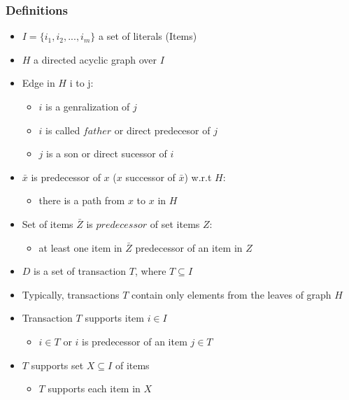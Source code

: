 \documentclass{article}
\begin{document}
\subsubsection{Definitions}
\begin{itemize}
  \item $I = \{i_1, i_2, ..., i_m\}$ a set of literals (Items)
  \item $H$ a directed acyclic graph over $I$
  \item Edge in $H$ i to j:

  \begin{itemize}
    \item $i$ is a genralization of $j$
    \item $i$ is called $father$ or direct predecesor of $j$
    \item $j$ is a son or direct sucessor of $i$
  \end{itemize}

  \item $\bar{x}$ is predecessor of $x$ ($x$ successor of $\bar{x}$) w.r.t $H$:
  \begin{itemize}
    \item there is a path from $x$ to $x$ in $H$
  \end{itemize}

  \item Set of items $\bar{Z}$ is $predecessor$ of set items $Z$:
  \begin{itemize}
    \item at least one item in $\bar{Z}$ predecessor of an item in $Z$
  \end{itemize}

  \item $D$ is a set of transaction $T$, where $T \subseteq I$
  \item Typically, transactions $T$ contain only elements from the leaves of graph $H$
  
  \item Transaction $T$ supports item $i \in I$
  \begin{itemize}
    \item $i \in T$ or $i$ is predecessor of an item $j \in T$
  \end{itemize}
  
  \item $T$ supports set $X \subseteq I$ of items
  \begin{itemize}
    \item $T$ supports each item in $X$
  \end{itemize}


\end{itemize}
\end{document}
